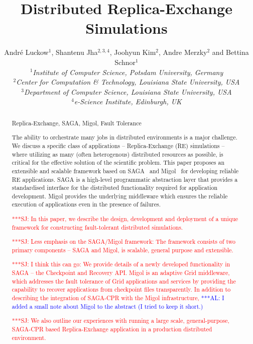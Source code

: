 \documentclass{rspublic}
\title[Distributed Replica-Exchange Simulations]{Distributed
  Replica-Exchange Simulations}
\author[Luckow, Jha, Kim, Merzky, Schnor]{
  Andr\'e Luckow$^{1}$, Shantenu Jha$^{2,3,4}$, Joohyun Kim$^{2}$, Andre Merzky$^{2}$ and Bettina Schnor$^{1}$\\
  \small{\emph{$^{1}$Institute of Computer Science, Potsdam University, Germany}}\\
  \small{\emph{$^{2}$Center for Computation \& Technology, Louisiana State University, USA}}\\
  \small{\emph{$^{3}$Department of Computer Science, Louisiana State
      University, USA}}\\
  \small{\emph{$^{4}$e-Science Institute, Edinburgh, UK}}\\
}
\newcommand{\alnote}[1]{ {\textcolor{blue} { ***AL: #1 }}}
\newcommand{\jhanote}[1]{ {\textcolor{red} { ***SJ: #1 }}}
\newcommand{\alnote}[1]{}
\newcommand{\jhanote}[1]{}
\begin{document}
 


\maketitle    

\begin{abstract}{Replica-Exchange, SAGA, Migol, Fault Tolerance}  

  The ability to orchestrate many jobs in distributed environments is
  a major challenge.  We discuss a specific class of applications --
  Replica-Exchange (RE) simulations -- where utilizing as many (often
  heterogenous) distributed resources as possible, is critical for the
  effective solution of the scientific problem.  This paper proposes
  an extensible and scalable framework based on
  SAGA~\citep{saga_gfd90} and Migol~\citep{schnorLuckow08} for
  developing reliable RE applications.  SAGA is a high-level
  programmatic abstraction layer that provides a standardised
  interface for the distributed functionality required for application
  development. Migol provides the underlying middleware which ensures
  the reliable execution of applications even in the presence of
  failures.

  \jhanote{In this paper, we describe the design, development and
    deployment of a unique framework for constructing fault-tolerant
    distributed simulations.}

  \jhanote{Less emphasis on the SAGA/Migol framework: The framework
    consists of two primary components -- SAGA and Migol, is scalable,
    general purpose and extensible.}

  \jhanote{I think this can go: We provide details of a newly
    developed functionality in SAGA -- the Checkpoint and Recovery
    API. Migol is an adaptive Grid middleware, which addresses the
    fault tolerance of Grid applications and services by providing the
    capability to recover applications from checkpoint files
    transparently.  In addition to describing the integration of
    SAGA-CPR with the Migol infrastructure,}
  \alnote{I added a small note about Migol to the abstract (I tried to keep
    it short.)}

  \jhanote{We also outline our experiences with running a large scale,
    general-purpose, SAGA-CPR based Replica-Exchange application in a
    production distributed environment.}

\end{abstract}
\end{document}
